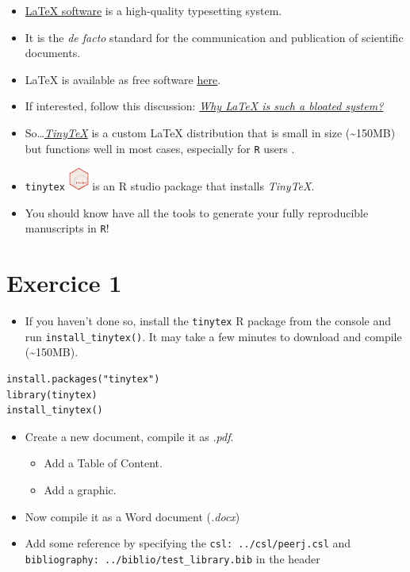 \documentclass[]{article}
\providecommand{\tightlist}{%
  \setlength{\itemsep}{0pt}\setlength{\parskip}{0pt}}
\begin{document}
\begin{itemize}
\item
  \href{https://www.latex-project.org}{LaTeX software} is a high-quality
  typesetting system.
\item
  It is the \emph{de facto} standard for the communication and
  publication of scientific documents.
\item
  LaTeX is available as free software
  \href{https://www.latex-project.org/get/}{here}.
\item
  If interested, follow this discussion:
  \href{https://ubuntuforums.org/showthread.php?t=395863}{\emph{Why
  LaTeX is such a bloated system?}}
\item
  So\ldots{}\href{https://yihui.name/tinytex/r/}{\emph{TinyTeX}} is a
  custom LaTeX distribution that is small in size
  (\textasciitilde{}150MB) but functions well in most cases, especially
  for \texttt{R} users .
\item
  \texttt{tinytex}
  \includegraphics[width=0.26042in,height=\textheight]{../figures/tinytex.png}
  is an R studio package that installs \emph{TinyTeX}.
\item
  You should know have all the tools to generate your fully reproducible
  manuscripts in \texttt{R}!
\end{itemize}

\hypertarget{exercice-1}{%
\section{Exercice 1}\label{exercice-1}}

\begin{itemize}
\tightlist
\item
  If you haven't done so, install the \texttt{tinytex} R package from
  the console and run \texttt{install\_tinytex()}. It may take a few
  minutes to download and compile (\textasciitilde{}150MB).
\end{itemize}

\begin{verbatim}
install.packages("tinytex")  
library(tinytex)  
install_tinytex()  
\end{verbatim}

\begin{itemize}
\item
  Create a new document, compile it as \emph{.pdf}.

  \begin{itemize}
  \tightlist
  \item
    Add a Table of Content.
  \item
    Add a graphic.
  \end{itemize}
\item
  Now compile it as a Word document (\emph{.docx})
\item
  Add some reference by specifying the \texttt{csl:\ ../csl/peerj.csl}
  and \texttt{bibliography:\ ../biblio/test\_library.bib} in the header
\end{itemize}
\end{document}
